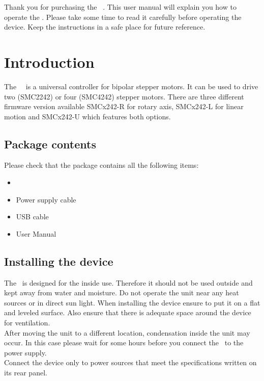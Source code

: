Thank you for purchasing the \productNumber ~\productName. This user
manual will explain you how to operate the \productName. Please take
some time to read it carefully before operating the device. Keep the
instructions in a safe place for future reference.

\section{Introduction}
The \productNumber ~\productName ~is a universal controller for  bipolar stepper motors. It can be used to drive two (SMC2242) or four (SMC4242) stepper motors. There are three different firmware version available SMCx242-R for rotary axis, SMCx242-L for linear motion and SMCx242-U which features both options.

\subsection{Package contents}
Please check that the package contains all the following items:
\begin{itemize}
\item \productNumber ~\productName
\item Power supply cable
\item USB cable
\item User Manual
\end{itemize}

\subsection{Installing the device}
The \productName ~is designed for the inside use. Therefore it should not be used outside and kept away from water and moisture. Do not operate the unit near any heat sources or in direct sun light. When installing the device ensure to put it on a flat and leveled surface. Also ensure that there is adequate space around the device for ventilation.\\
After moving the unit to a different location, condensation inside the unit may occur. In this case please wait for some hours before you connect the \productName ~to the power supply.\\
Connect the device only to power sources that meet the specifications written on its rear panel.

